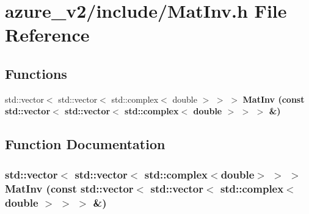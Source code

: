 \section{azure\_\-v2/include/Mat\-Inv.h File Reference}
\label{MatInv_8h}
\subsection*{Functions}
\begin{CompactItemize}
\item 
std::vector$<$ std::vector$<$ std::complex$<$ double $>$ $>$ $>$ \bf{Mat\-Inv} (const std::vector$<$ std::vector$<$ std::complex$<$ double $>$ $>$ $>$ \&)
\end{CompactItemize}


\subsection{Function Documentation}
\subsubsection{\setlength{\rightskip}{0pt plus 5cm}std::vector$<$ std::vector$<$ std::complex$<$double$>$ $>$ $>$ Mat\-Inv (const std::vector$<$ std::vector$<$ std::complex$<$ double $>$ $>$ $>$ \&)}\label{MatInv_8h_cc4840932166b2a718e7abf3f6e21ddf}


